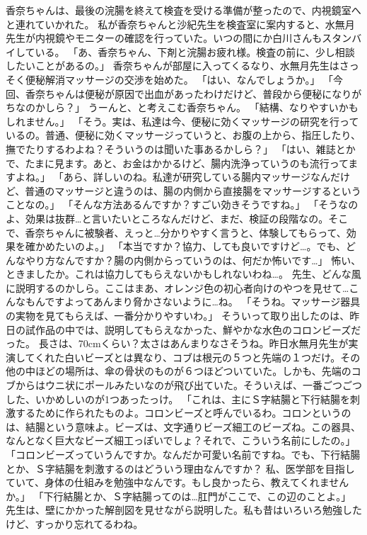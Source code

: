 香奈ちゃんは、最後の浣腸を終えて検査を受ける準備が整ったので、内視鏡室へと連れていかれた。
私が香奈ちゃんと沙紀先生を検査室に案内すると、水無月先生が内視鏡やモニターの確認を行っていた。いつの間にか白川さんもスタンバイしている。
「あ、香奈ちゃん、下剤と浣腸お疲れ様。検査の前に、少し相談したいことがあるの。」
香奈ちゃんが部屋に入ってくるなり、水無月先生はさっそく便秘解消マッサージの交渉を始めた。
「はい、なんでしょうか。」
「今回、香奈ちゃんは便秘が原因で出血があったわけだけど、普段から便秘になりがちなのかしら？」
うーんと、と考えこむ香奈ちゃん。
「結構、なりやすいかもしれません。」
「そう。実は、私達は今、便秘に効くマッサージの研究を行っているの。普通、便秘に効くマッサージっていうと、お腹の上から、指圧したり、撫でたりするわよね？そういうのは聞いた事あるかしら？」
「はい、雑誌とかで、たまに見ます。あと、お金はかかるけど、腸内洗浄っていうのも流行ってますよね。」
「あら、詳しいのね。私達が研究している腸内マッサージなんだけど、普通のマッサージと違うのは、腸の内側から直接腸をマッサージするということなの。」
「そんな方法あるんですか？すごい効きそうですね。」
「そうなのよ、効果は抜群…と言いたいところなんだけど、まだ、検証の段階なの。そこで、香奈ちゃんに被験者、えっと…分かりやすく言うと、体験してもらって、効果を確かめたいのよ。」
「本当ですか？協力、しても良いですけど…。でも、どんなやり方なんですか？腸の内側からっていうのは、何だか怖いです…」
怖い、ときましたか。これは協力してもらえないかもしれないわね…。
先生、どんな風に説明するのかしら。ここはまあ、オレンジ色の初心者向けのやつを見せて…こんなもんですよってあんまり脅かさないように…ね。
「そうね。マッサージ器具の実物を見てもらえば、一番分かりやすいわ。」
そういって取り出したのは、昨日の試作品の中では、説明してもらえなかった、鮮やかな水色のコロンビーズだった。
長さは、70cmくらい？太さはあんまりなさそうね。昨日水無月先生が実演してくれた白いビーズとは異なり、コブは根元の５つと先端の１つだけ。その他の中ほどの場所は、傘の骨状のものが６つほどついていた。しかも、先端のコブからはウニ状にポールみたいなのが飛び出ていた。そういえば、一番ごつごつした、いかめしいのが1つあったっけ。
「これは、主にＳ字結腸と下行結腸を刺激するために作られたものよ。コロンビーズと呼んでいるわ。コロンというのは、結腸という意味よ。ビーズは、文字通りビーズ細工のビーズね。この器具、なんとなく巨大なビーズ細工っぽいでしょ？それで、こういう名前にしたの。」
「コロンビーズっていうんですか。なんだか可愛い名前ですね。でも、下行結腸とか、Ｓ字結腸を刺激するのはどういう理由なんですか？ 私、医学部を目指していて、身体の仕組みを勉強中なんです。もし良かったら、教えてくれませんか。」
「下行結腸とか、Ｓ字結腸ってのは…肛門がここで、この辺のことよ。」
先生は、壁にかかった解剖図を見せながら説明した。私も昔はいろいろ勉強したけど、すっかり忘れてるわね。
